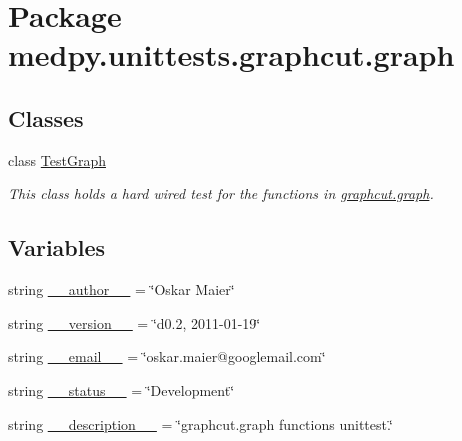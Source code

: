 \hypertarget{namespacemedpy_1_1unittests_1_1graphcut_1_1graph}{
\section{Package medpy.unittests.graphcut.graph}
\label{namespacemedpy_1_1unittests_1_1graphcut_1_1graph}
}
\subsection*{Classes}
\begin{DoxyCompactItemize}
\item 
class \hyperlink{classmedpy_1_1unittests_1_1graphcut_1_1graph_1_1TestGraph}{TestGraph}
\begin{DoxyCompactList}\small\item\em This class holds a hard wired test for the functions in \hyperlink{namespacemedpy_1_1unittests_1_1graphcut_1_1graph}{graphcut.graph}. \end{DoxyCompactList}\end{DoxyCompactItemize}
\subsection*{Variables}
\begin{DoxyCompactItemize}
\item 
string \hyperlink{namespacemedpy_1_1unittests_1_1graphcut_1_1graph_a0f4197b3549889b9e20536ac3e94ad01}{\_\-\_\-author\_\-\_\-} = \char`\"{}Oskar Maier\char`\"{}
\item 
string \hyperlink{namespacemedpy_1_1unittests_1_1graphcut_1_1graph_aa7e1e084ad063ebe80a5c37b9a61a1a6}{\_\-\_\-version\_\-\_\-} = \char`\"{}d0.2, 2011-\/01-\/19\char`\"{}
\item 
string \hyperlink{namespacemedpy_1_1unittests_1_1graphcut_1_1graph_a6a06490dea4aa5bb6338eceff5bad4d2}{\_\-\_\-email\_\-\_\-} = \char`\"{}oskar.maier@googlemail.com\char`\"{}
\item 
string \hyperlink{namespacemedpy_1_1unittests_1_1graphcut_1_1graph_a0bcf2b9ec9cd32318d01b5e49534d466}{\_\-\_\-status\_\-\_\-} = \char`\"{}Development\char`\"{}
\item 
string \hyperlink{namespacemedpy_1_1unittests_1_1graphcut_1_1graph_ab710730d849c9bc9ac28f4f0846cb982}{\_\-\_\-description\_\-\_\-} = \char`\"{}graphcut.graph functions unittest.\char`\"{}
\end{DoxyCompactItemize}


